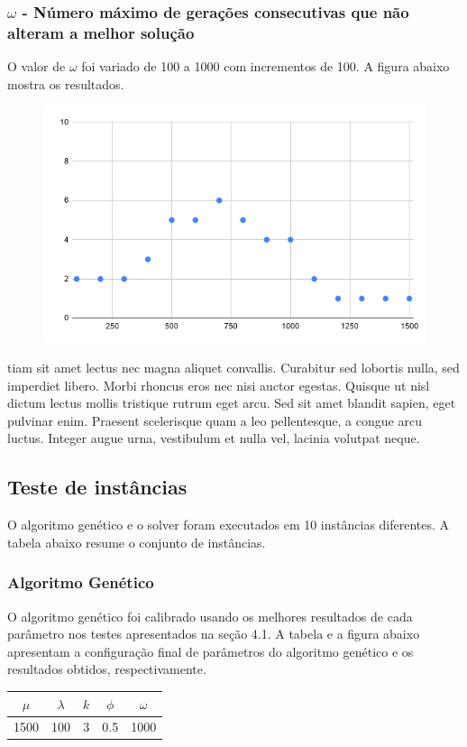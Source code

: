 \documentclass{article}
\begin{document}
\subsubsection{$\omega$ - Número máximo de gerações consecutivas que não alteram a melhor solução}
\quad O valor de $\omega$ foi variado de 100 a 1000 com incrementos de 100. A figura abaixo mostra os resultados.
\begin{figure}[H]
\centering
\includegraphics[scale=0.35]{placeholder}
\end{figure}
\quad tiam sit amet lectus nec magna aliquet convallis. Curabitur sed lobortis nulla, sed imperdiet libero. Morbi rhoncus eros nec nisi auctor egestas. Quisque ut nisl dictum lectus mollis tristique rutrum eget arcu. Sed sit amet blandit sapien, eget pulvinar enim. Praesent scelerisque quam a leo pellentesque, a congue arcu luctus. Integer augue urna, vestibulum et nulla vel, lacinia volutpat neque.


\subsection{Teste de instâncias}
\quad O algoritmo genético e o solver foram executados em 10 instâncias diferentes. A tabela abaixo resume o conjunto de instâncias.


\subsubsection{Algoritmo Genético}
\quad O algoritmo genético foi calibrado usando os melhores resultados de cada parâmetro nos testes apresentados na seção 4.1. A tabela e a figura abaixo apresentam a configuração final de parâmetros do algoritmo genético e os resultados obtidos, respectivamente.
\begin{table}[!htp]
\centering
\begin{tabular}{ccccc}
\hline
$\mu$ & $\lambda$ & $k$  & $\phi$ & $\omega$ \\ \hline
1500 & 100 & 3 & 0.5 & 1000 \\ \hline
\end{tabular}
\end{table}
\end{document}
